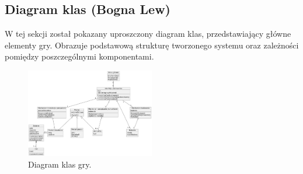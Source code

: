 \subsection{Diagram klas (Bogna Lew)}\label{ss:class}
W tej sekcji został pokazany uproszczony diagram klas, przedstawiający główne elementy gry. Obrazuje podstawową
strukturę tworzonego systemu oraz zależności pomiędzy poszczególnymi komponentami.
\begin{figure}[htbp]
    \centering
    \includegraphics[width=0.5\textwidth]{images/diagrams/class.png}
    \caption{Diagram klas gry.}\label{fig:classes}
\end{figure}